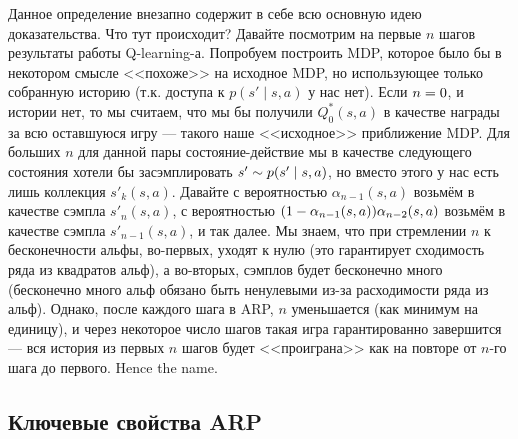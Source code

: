 Данное определение внезапно содержит в себе всю основную идею доказательства. Что тут происходит? Давайте посмотрим на первые $n$ шагов результаты работы Q-learning-а. Попробуем построить MDP, которое было бы в некотором смысле <<похоже>> на исходное MDP, но использующее только собранную историю (т.к. доступа к $p(s' \mid s, a)$ у нас нет). Если $n \HM= 0$, и истории нет, то мы считаем, что мы бы получили $Q^*_0(s, a)$ в качестве награды за всю оставшуюся игру --- такого наше <<исходное>> приближение MDP. Для больших $n$ для данной пары состояние-действие мы в качестве следующего состояния хотели бы засэмплировать $s' \HM\sim p(s' \HM\mid s, a)$, но вместо этого у нас есть лишь коллекция $s'_k(s, a)$. Давайте с вероятностью $\alpha_{n-1}(s, a)$ возьмём в качестве сэмпла $s'_n(s, a)$, с вероятностью $(1 \HM- \alpha_{n-1}(s, a))\alpha_{n-2}(s, a)$ возьмём в качестве сэмпла $s'_{n-1}(s, a)$, и так далее. Мы знаем, что при стремлении $n$ к бесконечности альфы, во-первых, уходят к нулю (это гарантирует сходимость ряда из квадратов альф), а во-вторых, сэмплов будет бесконечно много (бесконечно много альф обязано быть ненулевыми из-за расходимости ряда из альф). Однако, после каждого шага в ARP, $n$ уменьшается (как минимум на единицу), и через некоторое число шагов такая игра гарантированно завершится --- вся история из первых $n$ шагов будет <<проиграна>> как на повторе от $n$-го шага до первого. Hence the name.

\subsection{Ключевые свойства ARP}

